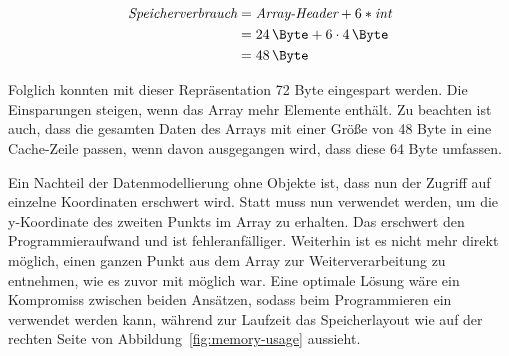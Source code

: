\begin{equation}
    \begin{split}
        \textit{Speicherverbrauch} & = \textit{Array-Header} + 6 * \textit{int} \\
        & = \SI{24}{\Byte} + 6 \cdot \SI{4}{\Byte} \\
        & = \SI{48}{\Byte}\label{eq:memory-usage-flat}
    \end{split}
\end{equation}

Folglich konnten mit dieser Repräsentation 72 Byte eingespart werden.
Die Einsparungen steigen, wenn das Array mehr Elemente enthält.
Zu beachten ist auch, dass die gesamten Daten des Arrays mit einer Größe von 48 Byte in eine Cache-Zeile passen, wenn davon ausgegangen wird, dass diese 64 Byte umfassen.

Ein Nachteil der Datenmodellierung ohne Objekte ist, dass nun der Zugriff auf einzelne Koordinaten erschwert wird.
Statt  muss nun  verwendet werden, um die y-Koordinate des zweiten Punkts im Array zu erhalten.
Das erschwert den Programmieraufwand und ist fehleranfälliger.
Weiterhin ist es nicht mehr direkt möglich, einen ganzen Punkt aus dem Array zur Weiterverarbeitung zu entnehmen, wie es zuvor mit  möglich war.
Eine optimale Lösung wäre ein Kompromiss zwischen beiden Ansätzen, sodass beim Programmieren ein  verwendet werden kann, während zur Laufzeit das Speicherlayout wie auf der rechten Seite von Abbildung~\ref{fig:memory-usage} aussieht.
